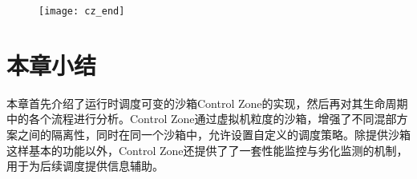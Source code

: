 \begin{figure}[!htbp]
    \centering
    \texttt{[image: cz\_end]}
    \label{fig:cz_end}
\end{figure}

\section{本章小结}

本章首先介绍了运行时调度可变的沙箱Control Zone的实现，然后再对其生命周期中的各个流程进行分析。Control Zone通过虚拟机粒度的沙箱，增强了不同混部方案之间的隔离性，同时在同一个沙箱中，允许设置自定义的调度策略。除提供沙箱这样基本的功能以外，Control Zone还提供了了一套性能监控与劣化监测的机制，用于为后续调度提供信息辅助。